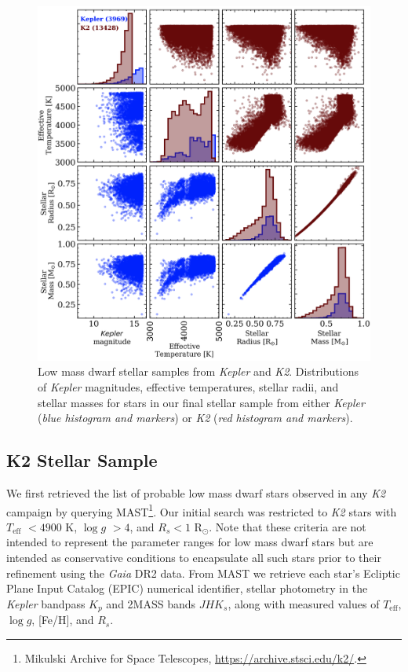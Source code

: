 \documentclass[twocolumn]{emulateapj}
\newcommand{\gaia}[1]{\emph{Gaia}#1}
\newcommand{\kepler}[1]{\emph{Kepler}#1}
\newcommand{\ktwo}[1]{\emph{K2}#1}
\newcommand{\teff}[1]{$T_{\text{eff}}$#1}
\newcommand{\logg}[1]{$\log{g}$#1}
\begin{document}
\begin{figure}
  \centering
  \includegraphics[width=0.98\hsize]{figures/stellar_corner_KepandK2.png}
  \caption{Low mass dwarf stellar samples from \kepler{} and \ktwo{.} Distributions of \kepler{} magnitudes,
    effective temperatures, stellar radii, and stellar masses for stars in our final stellar sample from either
    \kepler{} (\emph{blue histogram and markers}) or \ktwo{} (\emph{red histogram and markers}).}
  \label{fig:stars}
\end{figure}

\subsection{K2 Stellar Sample}
We first retrieved the list of probable low mass dwarf stars observed in any \ktwo{} campaign by querying
MAST\footnote{Mikulski Archive for Space Telescopes, \url{https://archive.stsci.edu/k2/}.}. Our initial
search was restricted to \ktwo{} stars with \teff{} $<4900$ K, \logg{} $>4$, and $R_s<1$ R$_{\odot}$. Note that these
criteria are not intended to represent the parameter ranges for low mass dwarf stars but are intended as
conservative conditions to encapsulate all such stars prior to their refinement using the \gaia{} DR2
data. From MAST we retrieve each star's Ecliptic Plane Input Catalog
(EPIC) numerical identifier, stellar photometry in the \kepler{} bandpass $K_p$ and 2MASS bands $JHK_s$, along
with measured values of \teff{,} \logg{,} [Fe/H], and $R_s$.
\end{document}
